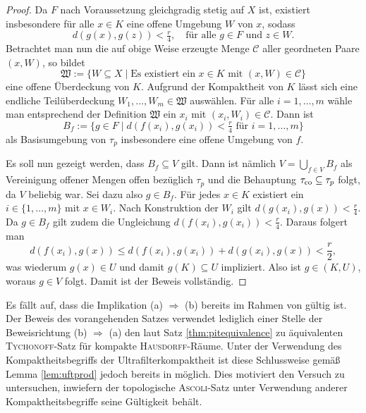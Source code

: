 \begin{proof}
  Da $F$ nach Voraussetzung gleichgradig stetig auf $X$ ist, existiert insbesondere für alle $x \in K$ eine offene Umgebung $W$ von $x$, sodass 
  \begin{displaymath}
    d(g(x),g(z)) < \tfrac{r}{4}, \quad \text{für alle $g \in F$ und $z \in W$}.
  \end{displaymath}
  Betrachtet man nun die auf obige Weise erzeugte Menge $\mathcal{C}$ aller geordneten Paare $(x,W)$, so bildet
  \begin{displaymath}
    \mathfrak{W} := \{W \subseteq X \mid \text{Es existiert ein $x \in K$ mit $(x,W) \in \mathcal{C}$} \}
  \end{displaymath}
  eine offene Überdeckung von $K$.
  Aufgrund der Kompaktheit von $K$ lässt sich eine endliche Teilüberdeckung $W_1,\dots,W_m \in \mathfrak{W}$ auswählen.
  Für alle $i = 1,\dots,m$ wähle man entsprechend der Definition $\mathfrak{W}$ ein $x_i$ mit $(x_i,W_i) \in \mathcal{C}$.
  Dann ist
  \begin{displaymath}
    B_f := \{ g \in F \mid d(f(x_i),g(x_i)) < \tfrac{r}{4} \text{ für } i = 1,\dots,m\}
  \end{displaymath}
  als Basisumgebung von $\tau_p$ insbesondere eine offene Umgebung von $f$.

  Es soll nun gezeigt werden, dass $B_f \subseteq V$ gilt.
  Dann ist nämlich $V = \bigcup_{f \in V} B_f$ als Vereinigung offener Mengen offen bezüglich $\tau_p$ und die Behauptung $\tau_{\mathrm{co}} \subseteq \tau_p$ folgt, da $V$ beliebig war.
  Sei dazu also $g \in B_f$.
  Für jedes $x \in K$ existiert ein $i \in \{1,\dots,m\}$ mit $x \in W_i$.
  Nach Konstruktion der $W_i$ gilt $d(g(x_i),g(x)) < \tfrac{r}{4}$.
  Da $g \in B_f$ gilt zudem die Ungleichung $d(f(x_i),g(x_i)) < \tfrac{r}{4}$.
  Daraus folgert man
  \begin{displaymath}
    d(f(x_i),g(x)) \leq d(f(x_i),g(x_i)) + d(g(x_i),g(x)) < \frac{r}{2},
  \end{displaymath}
  was wiederum $g(x) \in U$ und damit $g(K) \subseteq U$ impliziert. 
  Also ist $g \in (K,U)$, woraus $g \in V$ folgt.
  Damit ist der Beweis vollständig.
\end{proof}

Es fällt auf, dass die Implikation (a) $\Rightarrow$ (b) bereits im Rahmen von \ZF gültig ist.
Der Beweis des vorangehenden Satzes verwendet lediglich einer Stelle der Beweisrichtung (b) $\Rightarrow$ (a) den laut Satz \ref{thm:pitequivalence} zu \PIT äquivalenten \textsc{Tychonoff}-Satz für kompakte \textsc{Hausdorff}-Räume.
Unter der Verwendung des Kompaktheitsbegriffs der Ultrafilterkompaktheit ist diese Schlussweise gemäß Lemma \ref{lem:uftprod} jedoch bereits in \ZF möglich.  
Dies motiviert den Versuch zu untersuchen, inwiefern der topologische \textsc{Ascoli}-Satz unter Verwendung anderer Kompaktheitsbegriffe seine Gültigkeit behält.

